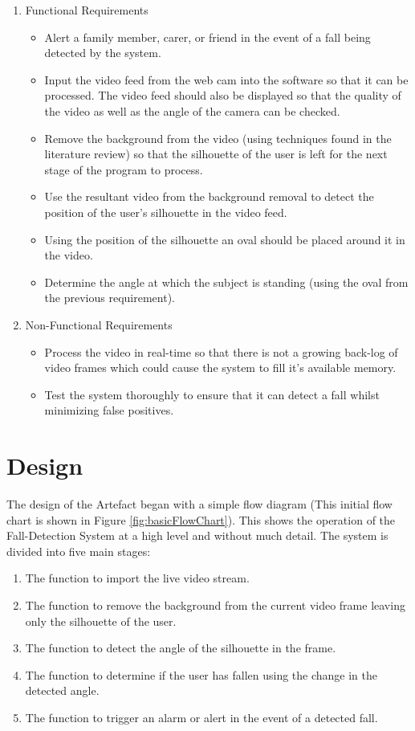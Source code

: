 \documentclass[11pt,a4paper]{report}
\begin{document}
\begin{enumerate}
   \item Functional Requirements
   \begin{itemize}
   	\item Alert a family member, carer, or friend in the event of a fall being detected by the
system.
  \item Input the video feed from the web cam into the software so that it can be processed. The video feed should also be displayed so that the quality of the video as well as the angle of the camera can be checked.
      \item Remove the background from the video (using techniques found in the literature review) so that the silhouette of the user is left for the next stage of the program to process.
      \item Use the resultant video from the background removal to detect the position of the user’s silhouette in the video feed.
      \item Using the position of the silhouette an oval should be placed around it in the video.
      \item Determine the angle at which the subject is standing (using the oval from the previous requirement).
   \end{itemize}
   \item Non-Functional Requirements
    \begin{itemize}
    \item Process the video in real-time so that there is not a growing back-log of video frames which could cause the system to fill it's available memory.
	\item Test the system thoroughly to ensure that it can detect a fall whilst minimizing false positives.
    \end{itemize}
\end{enumerate}

\section{Design}

The design of the Artefact began with a simple flow diagram (This initial flow chart is shown in Figure \ref{fig:basicFlowChart}). This shows the operation of the Fall-Detection System at a high level and without much detail. The system is divided into five main stages:

\begin{enumerate}
	\item The function to import the live video stream.
    \item The function to remove the background from the current video frame leaving only the silhouette of the user.
    \item The function to detect the angle of the silhouette in the frame.
    \item The function to determine if the user has fallen using the change in the detected angle.
    \item The function to trigger an alarm or alert in the event of a detected fall.
\end{enumerate}
\end{document}
